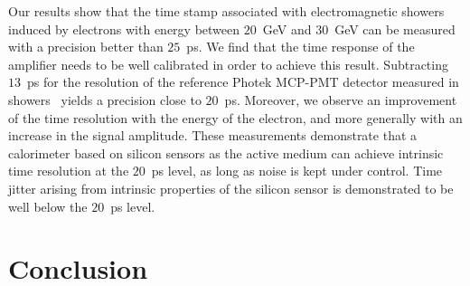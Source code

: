 \documentclass[preprint,1p]{elsarticle}
\begin{document}

Our results show that the time stamp associated with electromagnetic showers
induced by electrons with energy between $20$~GeV and $30$~GeV can be measured
with a precision better than $25$~ps. We find that the time response of the
amplifier needs to be well calibrated in order to achieve this result.
Subtracting $13$~ps for the resolution of the reference Photek MCP-PMT detector
measured in showers~\cite{Ronzhin2015288} yields a precision close to $20$~ps.
Moreover, we observe an improvement of the time resolution with the energy of
the electron, and more generally with an increase in the signal amplitude. These
measurements demonstrate that a calorimeter based on silicon sensors as the
active medium can achieve intrinsic time resolution at the $20$~ps level, as
long as noise is kept under control. Time jitter arising from intrinsic
properties of the silicon sensor is demonstrated to be well below the $20$~ps
level.

\section{Conclusion}
\label{sec:conclusion} 
\end{document}
